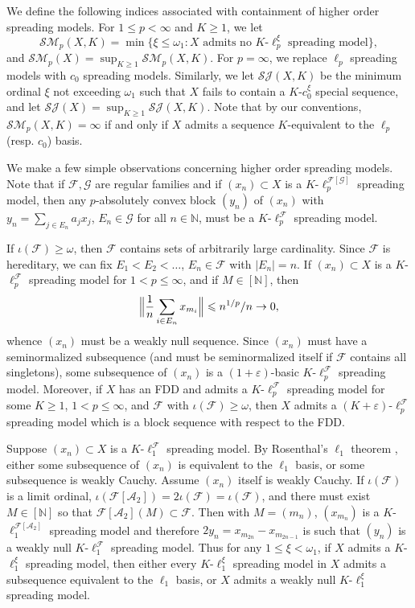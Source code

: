 \documentclass[12pt]{amsart}
\theoremstyle{definition}
\newcommand{\infin}{[\mathbb{N}]}
\newcommand{\nn}{\mathbb{N}}
\newcommand{\aaa}{\mathcal{A}}
\newcommand{\fff}{\mathcal{F}}
\newcommand{\gggg}{\mathcal{G}}
\newcommand{\ssm}{\mathcal{SM}}
\newcommand{\ssj}{\mathcal{SJ}}
\begin{document}
We define the following indices associated with containment of higher order spreading models.  For $1\leqslant p< \infty$ and $K\geqslant 1$, we let $$\ssm_p(X,K)=\min \{\xi\leqslant \omega_1: X\text{\ admits no\ }K\text{-}\ell_p^\xi \text{\ spreading model}\},$$  and $\ssm_p(X)=\sup_{K\geqslant 1}\ssm_p(X,K)$. For $p=\infty$, we replace $\ell_p$ spreading models with $c_0$ spreading models. Similarly, we let $\ssj(X,K)$ be the minimum ordinal $\xi$ not exceeding $\omega_1$ such that $X$ fails to contain a $K$-$c_0^\xi$ special sequence, and let $\ssj(X)=\sup_{K\geqslant 1}\ssj(X, K)$.  Note that by our conventions, $\ssm_p(X,K)=\infty$ if and only if $X$ admits a sequence $K$-equivalent to the $\ell_p$ (resp. $c_0$) basis.  

We make a few simple observations concerning higher order spreading models.  Note that if $\fff, \gggg$ are regular families and if $(x_n)\subset X$ is a $K$-$\ell_p^{\fff[\gggg]}$ spreading model, then any $p$-absolutely convex block $(y_n)$ of $(x_n)$ with $y_n=\sum_{j\in E_n} a_jx_j$, $E_n\in \gggg$ for all $n\in \nn$, must be a $K$-$\ell_p^\fff$ spreading model.  

If $\iota(\fff)\geqslant \omega$, then $\fff$ contains sets of arbitrarily large cardinality. Since $\fff$ is hereditary, we can fix $E_1<E_2<\ldots$, $E_n\in \fff$ with $|E_n|=n$.   If $(x_n)\subset X$ is a $K$-$\ell_p^\fff$ spreading model for $1<p\leqslant \infty$, and if $M\in \infin$, then $$\Bigl\|\frac{1}{n}\sum_{i\in E_n} x_{m_i}\Bigr\|\leqslant n^{1/p}/n\to 0,$$ whence $(x_n)$ must be a weakly null sequence. Since $(x_n)$ must have a seminormalized subsequence (and must be seminormalized itself if $\fff$ contains all singletons), some subsequence of $(x_n)$ is a $(1+\varepsilon)$-basic $K$-$\ell_p^\fff$ spreading model. Moreover, if $X$ has an FDD and admits a $K$-$\ell_p^\fff$ spreading model for some $K\geqslant 1$, $1<p\leqslant \infty$, and $\fff$ with $\iota(\fff)\geqslant \omega$, then $X$ admits a $(K+\varepsilon)$-$\ell_p^\fff$ spreading model which is a block sequence with respect to the FDD.  

Suppose $(x_n)\subset X$ is a $K$-$\ell_1^\fff$ spreading model.  By Rosenthal's $\ell_1$ theorem \cite{Rosenthal}, either some subsequence of $(x_n)$ is equivalent to the $\ell_1$ basis, or some subsequence is weakly Cauchy.  Assume $(x_n)$ itself is weakly Cauchy.  If $\iota(\fff)$ is a limit ordinal, $\iota(\fff[\aaa_2])=2\iota(\fff)=\iota(\fff)$, and there must exist $M\in \infin$ so that $\fff[\aaa_2](M)\subset \fff$.  Then with $M=(m_n)$, $(x_{m_n})$ is a $K$-$\ell_1^{\fff[\aaa_2]}$ spreading model and therefore $2y_n=x_{m_{2n}}-x_{m_{2n-1}}$ is such that $(y_n)$ is a weakly null $K$-$\ell_1^\fff$ spreading model.  Thus for any $1\leqslant \xi< \omega_1$, if $X$ admits a $K$-$\ell_1^\xi$ spreading model, then either every $K$-$\ell_1^\xi$ spreading model in $X$ admits a subsequence equivalent to the $\ell_1$ basis, or $X$ admits a weakly null $K$-$\ell_1^\xi$ spreading model.  
\end{document}
